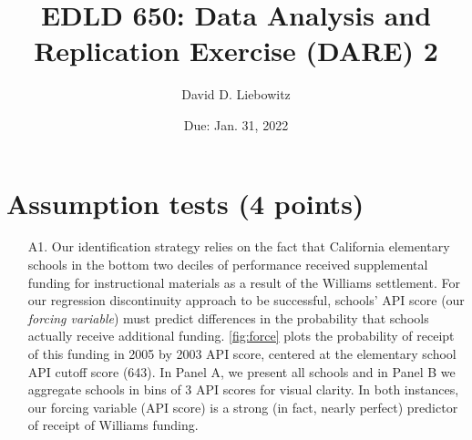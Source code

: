 \documentclass[a4paper, 11pt]{article}
\title{EDLD 650: Data Analysis and Replication Exercise (DARE) 2}
\author{David D. Liebowitz}
\date{Due: Jan. 31, 2022}
\begin{document}
\maketitle



\section{Assumption tests (4 points)}

\begin{enumerate}
	\item[A1.] Our identification strategy relies on the fact that California elementary schools in the bottom two deciles of performance received supplemental funding for instructional materials as a result of the Williams settlement. For our regression discontinuity approach to be successful, schools' API score (our \textit{forcing variable}) must predict differences in the probability that schools actually receive additional funding. \autoref{fig:force} plots the probability of receipt of this funding in 2005 by 2003 API score, centered at the elementary school API cutoff score (643). In Panel A, we present all schools and in Panel B we aggregate schools in bins of 3 API scores for visual clarity. In both instances, our forcing variable (API score) is a strong (in fact, nearly perfect) predictor of receipt of Williams funding. 


\end{enumerate}
\end{document}
